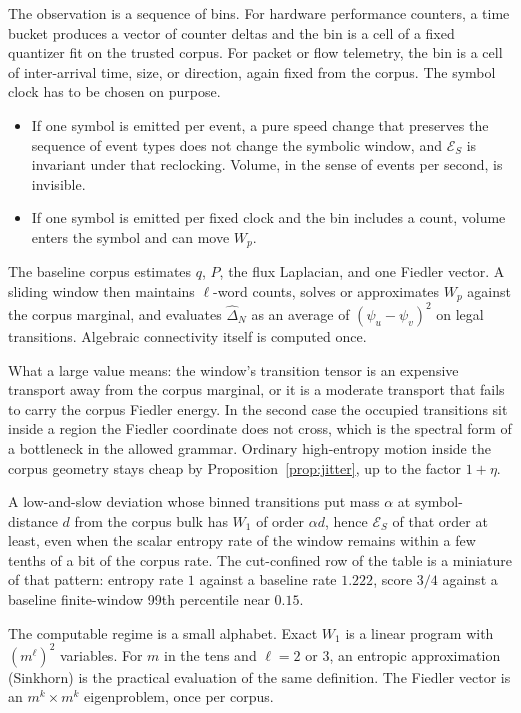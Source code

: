 \documentclass[11pt,reqno]{amsart}
\theoremstyle{remark}
\newcommand{\ES}{\mathcal{E}_S}
\begin{document}
The observation is a sequence of bins. For hardware performance counters, a time bucket produces a vector of counter deltas and the bin is a cell of a fixed quantizer fit on the trusted corpus. For packet or flow telemetry, the bin is a cell of inter-arrival time, size, or direction, again fixed from the corpus. The symbol clock has to be chosen on purpose.
\begin{itemize}
\item If one symbol is emitted per event, a pure speed change that preserves the sequence of event types does not change the symbolic window, and $\ES$ is invariant under that reclocking. Volume, in the sense of events per second, is invisible.
\item If one symbol is emitted per fixed clock and the bin includes a count, volume enters the symbol and can move $W_p$.
\end{itemize}

The baseline corpus estimates $q$, $P$, the flux Laplacian, and one Fiedler vector. A sliding window then maintains $\ell$-word counts, solves or approximates $W_p$ against the corpus marginal, and evaluates $\hat\Delta_N$ as an average of $(\psi_u-\psi_v)^2$ on legal transitions. Algebraic connectivity itself is computed once.

What a large value means: the window's transition tensor is an expensive transport away from the corpus marginal, or it is a moderate transport that fails to carry the corpus Fiedler energy. In the second case the occupied transitions sit inside a region the Fiedler coordinate does not cross, which is the spectral form of a bottleneck in the allowed grammar. Ordinary high-entropy motion inside the corpus geometry stays cheap by Proposition~\ref{prop:jitter}, up to the factor $1+\eta$.

A low-and-slow deviation whose binned transitions put mass $\alpha$ at symbol-distance $d$ from the corpus bulk has $W_1$ of order $\alpha d$, hence $\ES$ of that order at least, even when the scalar entropy rate of the window remains within a few tenths of a bit of the corpus rate. The cut-confined row of the table is a miniature of that pattern: entropy rate $1$ against a baseline rate $1.222$, score $3/4$ against a baseline finite-window 99th percentile near $0.15$.

The computable regime is a small alphabet. Exact $W_1$ is a linear program with $(m^\ell)^2$ variables. For $m$ in the tens and $\ell = 2$ or $3$, an entropic approximation (Sinkhorn) is the practical evaluation of the same definition. The Fiedler vector is an $m^k \times m^k$ eigenproblem, once per corpus.
\end{document}
